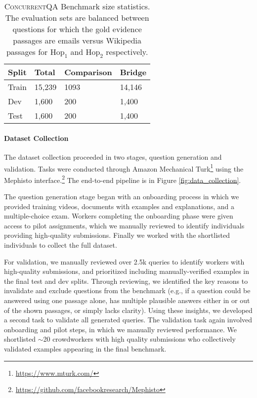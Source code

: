 \documentclass{article}
\newcommand{\datasetname}{\textsc{ConcurrentQA}\xspace}
\begin{document}
\begin{table}[t]
\begin{center}
\begin{tabular}{p{1cm}p{1.5cm}p{2cm}p{1.5cm}}
\toprule
Split & Total & Comparison & Bridge \\
\midrule
Train & 15,239  &  1093 & 14,146 \\
Dev   & 1,600 & 200 & 1,400 \\
Test  & 1,600 & 200 & 1,400 \\
\bottomrule
\end{tabular}
\caption{\datasetname Benchmark size statistics. The evaluation sets are balanced between questions for which the gold evidence passages are emails versus Wikipedia passages for $\mathrm{Hop_1}$ and $\mathrm{Hop_2}$ respectively.}
\vspace{-6mm}
\label{tab:mutlihopqa_splits}
\end{center}
\end{table}

\paragraph{Dataset Collection}
The dataset collection proceeded in two stages, question generation and validation. 
Tasks were conducted through Amazon Mechanical Turk\footnote{\url{https://www.mturk.com/}} using the Mephisto interface.\footnote{\url{https://github.com/facebookresearch/Mephisto}} The end-to-end pipeline is in Figure \ref{fig:data_collection}. 

The question generation stage began with an onboarding process in which we provided training videos, documents with examples and explanations, and a multiple-choice exam. Workers completing the onboarding phase were given access to pilot assignments, which we manually reviewed to identify individuals providing high-quality submissions. Finally we worked with the shortlisted individuals to collect the full dataset. 

For validation, we manually reviewed over 2.5k queries to identify workers with high-quality submissions, and prioritized including manually-verified examples in the final test and dev splits. Through reviewing, we identified the key reasons to invalidate and exclude questions from the benchmark (e.g., if a question could be answered using one passage alone, has multiple plausible answers either in or out of the shown passages, or simply lacks clarity). Using these insights, we developed a second task to validate all generated queries. 
The validation task again involved onboarding and pilot steps, in which we manually reviewed performance. We shortlisted $\sim$20 crowdworkers with high quality submissions who collectively validated examples appearing in the final benchmark. 
\end{document}
